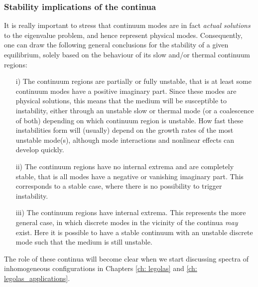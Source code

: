 \subsubsection{Stability implications of the continua}
It is really important to stress that continuum modes are in fact \emph{actual solutions} to the eigenvalue problem, and hence represent physical modes. Consequently, one can draw the following general conclusions for the stability of a given equilibrium, solely based on the behaviour of its slow and/or thermal continuum regions:

\begin{itemize}
	\item[i)] The continuum regions are partially or fully unstable, that is at least some continuum modes have a positive imaginary part. Since these modes are physical solutions, this means that the medium will be susceptible to instability, either through an unstable slow or thermal mode (or a coalescence of both) depending on which continuum region is unstable. How fast these instabilities form will (usually) depend on the growth rates of the most unstable mode(s), although mode interactions and nonlinear effects can develop quickly.
	\item[ii)] The continuum regions have no internal extrema and are completely stable, that is all modes have a negative or vanishing imaginary part. This corresponds to a stable case, where there is no possibility to trigger instability.
	\item[iii)] The continuum regions have internal extrema. This represents the more general case, in which discrete modes in the vicinity of the continua \textit{may} exist. Here it is possible to have a stable continuum with an unstable discrete mode such that the medium is still unstable.
\end{itemize}

The role of these continua will become clear when we start discussing spectra of inhomogeneous configurations in Chapters \ref{ch: legolas} and \ref{ch: legolas_applications}.

\cleardoublepage

